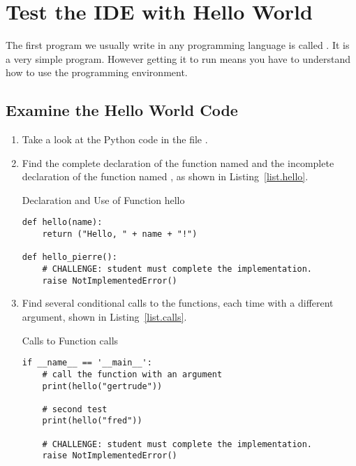 \section{Test the IDE with Hello World}
\label{sec.hello.world}

The first program we usually write in any programming language is
called .  It is a very simple program.  However
getting it to run means you have to understand how to use the
programming environment.

\subsection{Examine the Hello World Code}
\label{sec.examine.the.code}
\begin{enumerate}
\item Take a look at the Python code in the file . 

\item Find the complete declaration of the function named  and
  the incomplete declaration of the function named , as shown in Listing~\ref{list.hello}.

\begin{listing}{Declaration and Use of Function }{hello}
\begin{minipage}[c]{0.95\textwidth}\begin{lstlisting}
def hello(name):
    return ("Hello, " + name + "!")

def hello_pierre():
    # CHALLENGE: student must complete the implementation.
    raise NotImplementedError()
\end{lstlisting}\end{minipage}\end{listing}

\item Find several conditional calls to the functions, each time
  with a different argument, shown in Listing~\ref{list.calls}.


\begin{listing}{Calls to Function }{calls}
\begin{minipage}[c]{0.95\textwidth}\begin{lstlisting}
if __name__ == '__main__':
    # call the function with an argument
    print(hello("gertrude"))
    
    # second test
    print(hello("fred"))

    # CHALLENGE: student must complete the implementation.
    raise NotImplementedError()
\end{lstlisting}\end{minipage}\end{listing}



\end{enumerate}
